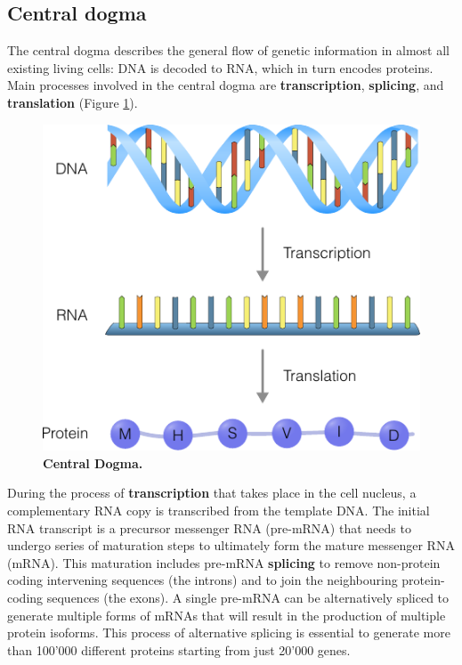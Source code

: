 \subsection{Central dogma}
The central dogma describes the general flow of genetic information in almost all existing living cells: DNA is decoded to RNA, which in turn encodes proteins\cite{strachan_humanmoleculargenetics_2011}. Main processes involved in the central dogma are \textbf{transcription}, \textbf{splicing}, and \textbf{translation} (Figure \ref{fig:centraldogma}). 

\begin{figure}[htb!]
	\centering\includegraphics[width=.5\linewidth]{fig/central_dogma} %
	\caption{
		\textbf{Central Dogma.}
	}
	\label{fig:centraldogma}
\end{figure}

During the process of \textbf{transcription} that takes place in the cell nucleus, a complementary RNA copy is transcribed from the template DNA. The initial RNA transcript is a precursor messenger RNA (pre-mRNA) that needs to undergo series of maturation steps to ultimately form the mature messenger RNA (mRNA). This maturation includes pre-mRNA \textbf{splicing} to remove non-protein coding intervening sequences (the introns) and to join the neighbouring protein-coding sequences (the exons). A single pre-mRNA can be alternatively spliced to generate multiple forms of mRNAs that will result in the production of multiple protein isoforms. This process of alternative splicing is essential to generate more than 100'000 different proteins starting from just 20'000 genes\cite{nilsen_expansioneukaryoticproteome_2010}.

